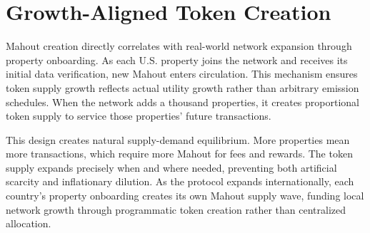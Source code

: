 \section{Growth-Aligned Token Creation}

Mahout creation directly correlates with real-world network expansion through property onboarding. As each U.S. property joins the network and receives its initial data verification, new Mahout enters circulation. This mechanism ensures token supply growth reflects actual utility growth rather than arbitrary emission schedules. When the network adds a thousand properties, it creates proportional token supply to service those properties' future transactions.

This design creates natural supply-demand equilibrium. More properties mean more transactions, which require more Mahout for fees and rewards. The token supply expands precisely when and where needed, preventing both artificial scarcity and inflationary dilution. As the protocol expands internationally, each country's property onboarding creates its own Mahout supply wave, funding local network growth through programmatic token creation rather than centralized allocation.

